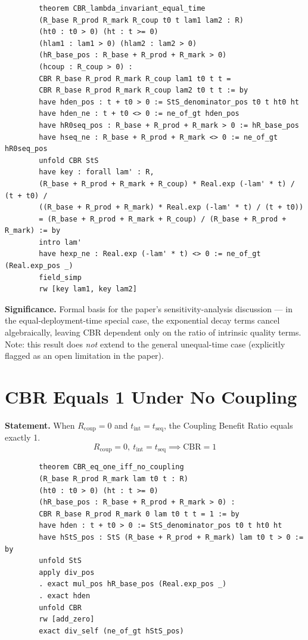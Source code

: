 \documentclass[11pt,a4paper]{article}
\begin{document}
	\begin{lstlisting}
		theorem CBR_lambda_invariant_equal_time
		(R_base R_prod R_mark R_coup t0 t lam1 lam2 : R)
		(ht0 : t0 > 0) (ht : t >= 0)
		(hlam1 : lam1 > 0) (hlam2 : lam2 > 0)
		(hR_base_pos : R_base + R_prod + R_mark > 0)
		(hcoup : R_coup > 0) :
		CBR R_base R_prod R_mark R_coup lam1 t0 t t =
		CBR R_base R_prod R_mark R_coup lam2 t0 t t := by
		have hden_pos : t + t0 > 0 := StS_denominator_pos t0 t ht0 ht
		have hden_ne : t + t0 <> 0 := ne_of_gt hden_pos
		have hR0seq_pos : R_base + R_prod + R_mark > 0 := hR_base_pos
		have hseq_ne : R_base + R_prod + R_mark <> 0 := ne_of_gt hR0seq_pos
		unfold CBR StS
		have key : forall lam' : R,
		(R_base + R_prod + R_mark + R_coup) * Real.exp (-lam' * t) / (t + t0) /
		((R_base + R_prod + R_mark) * Real.exp (-lam' * t) / (t + t0))
		= (R_base + R_prod + R_mark + R_coup) / (R_base + R_prod + R_mark) := by
		intro lam'
		have hexp_ne : Real.exp (-lam' * t) <> 0 := ne_of_gt (Real.exp_pos _)
		field_simp
		rw [key lam1, key lam2]
	\end{lstlisting}
	
	\noindent\textbf{Significance.} Formal basis for the paper's sensitivity-analysis discussion --- in the equal-deployment-time special case, the exponential decay terms cancel algebraically, leaving CBR dependent only on the ratio of intrinsic quality terms. Note: this result does \emph{not} extend to the general unequal-time case (explicitly flagged as an open limitation in the paper).
	
	\section{CBR Equals 1 Under No Coupling}
	
	\textbf{Statement.} When $R_{\text{coup}} = 0$ and $t_{\text{int}} = t_{\text{seq}}$, the Coupling Benefit Ratio equals exactly 1.
	\begin{equation}
		R_{\text{coup}} = 0,\ t_{\text{int}} = t_{\text{seq}} \implies \text{CBR} = 1
	\end{equation}
	
	\begin{lstlisting}
		theorem CBR_eq_one_iff_no_coupling
		(R_base R_prod R_mark lam t0 t : R)
		(ht0 : t0 > 0) (ht : t >= 0)
		(hR_base_pos : R_base + R_prod + R_mark > 0) :
		CBR R_base R_prod R_mark 0 lam t0 t t = 1 := by
		have hden : t + t0 > 0 := StS_denominator_pos t0 t ht0 ht
		have hStS_pos : StS (R_base + R_prod + R_mark) lam t0 t > 0 := by
		unfold StS
		apply div_pos
		. exact mul_pos hR_base_pos (Real.exp_pos _)
		. exact hden
		unfold CBR
		rw [add_zero]
		exact div_self (ne_of_gt hStS_pos)
	\end{lstlisting}
	
\end{document}
